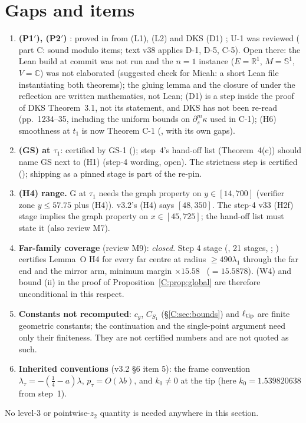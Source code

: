 \documentclass[11pt]{article}
\begin{document}
\section{Gaps and items}\label{C:sec:gaps}
\begin{enumerate}[leftmargin=*]
\item \textbf{(P1$'$), (P2$'$)} \tH: proved in  from (L1), (L2) \cite{CWFlow} and DKS (D1) \cite{DKS2002}; U-1 was reviewed ( part C: sound modulo items; text v38 applies D-1, D-5, C-5). Open there: the Lean build at commit  was not run and the $n=1$ instance ($E=\mathbb R^1$, $M=\mathbb S^1$, $V=\mathbb C$) was not elaborated (suggested check for Micah: a short Lean file instantiating both theorems); the gluing lemma and the closure of  under the reflection are written mathematics, not Lean; (D1) is a step inside the proof of DKS Theorem~3.1, not its statement, and DKS has not been re-read (pp.~1234--35, including the uniform bounds on $\partial_s^m\kappa$ used in C-1); (H6) smoothness at $t_1$ is now Theorem C-1 (, with its own gaps).
\item \textbf{(GS) at $\tau_1$}: certified by GS-1 (); step~4's hand-off list (Theorem~4(c)) should name GS next to (H1) (step-4 wording, open). The strictness step is certified (); shipping  as a pinned stage is part of the re-pin.
\item \textbf{(H4) range.} G at $\tau_1$ needs the graph property on $y\in[14,700]$ (verifier zone $y\le57.75$ plus (H4)). v3.2's (H4) says $[48,350]$. The step-4 v33 (H2f) stage implies the graph property on $x\in[45,725]$; the hand-off list must state it (also review M7).
\item \textbf{Far-family coverage} (review M9): \emph{closed}. Step 4 stage  (, 21 stages, ; ) certifies Lemma~O H4 for every far centre at radius $\ge490\lambda_1$ through the far end and the mirror arm, minimum margin $\times15.58$ \tC\ ($=15.5878$). (W4) and bound (ii) in the proof of Proposition~\ref{C:prop:global} are therefore unconditional in this respect.
\item \textbf{Constants not recomputed}: $c_g$, $C_{S_1}$ (\S\ref{C:sec:bounds}) and $\ell_{\rm tip}$ are finite geometric constants; the continuation and the single-point argument need only their finiteness. They are not certified numbers and are not quoted as such.
\item \textbf{Inherited conventions} (v3.2 \S6 item 5): the frame convention $\lambda_\tau=-(\frac14-a)\lambda$, $p_\tau=O(\lambda b)$, and $k_0\ne0$ at the tip (here $k_0=1.539820638$ from step~1).
\end{enumerate}
No level-3 or pointwise-$z_2$ quantity is needed anywhere in this section.
\end{document}
